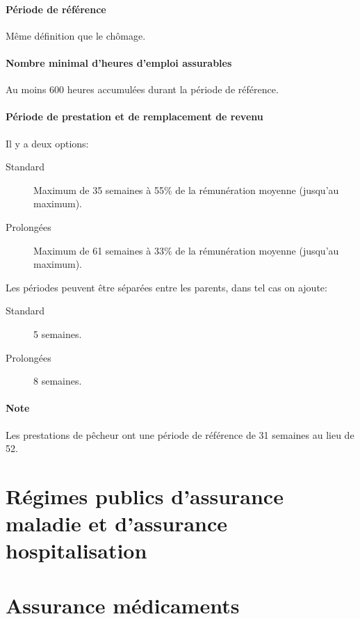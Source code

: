 \documentclass[10pt, french]{article}
\begin{document}
\begin{multicols*}{3}
\begin{definitionNOHFILL}
\paragraph{Période de référence}
Même définition que le chômage.

\paragraph{Nombre minimal d'heures d'emploi assurables}
Au moins 600 heures accumulées durant la période de référence.

\paragraph{Période de prestation et de remplacement de revenu}
Il y a deux options:
\begin{description}
	\item[Standard]	Maximum de 35 semaines à 55\% de la rémunération moyenne (jusqu'au maximum).
	\item[Prolongées]	Maximum de 61 semaines à 33\% de la rémunération moyenne (jusqu'au maximum).
\end{description}

Les périodes peuvent être séparées entre les parents, dans tel cas on ajoute:
\begin{description}
	\item[Standard]	5 semaines.
	\item[Prolongées]	8 semaines.
\end{description}
\end{definitionNOHFILL}

\paragraph{Note}	Les prestations de pêcheur ont une période de référence de 31 semaines au lieu de 52.

\newpage

\section{Régimes publics d'assurance maladie et d'assurance hospitalisation}

\newpage

\section{Assurance médicaments}


\end{multicols*}
\end{document}
